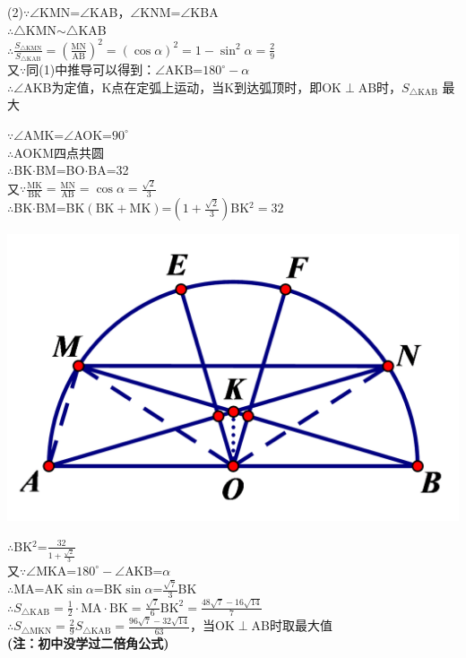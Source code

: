 \documentclass{article}
\begin{document}
    \newpage
    \noindent (2)\quad $\because $\quad $\angle $KMN=$\angle $KAB，$\angle $KNM=$\angle $KBA \\
    $\therefore $\quad $\bigtriangleup $KMN$\sim $$\bigtriangleup $KAB \\
    $\therefore $\quad $\frac{S_{\bigtriangleup\text{KMN}}}{S_{\bigtriangleup\text{KAB}}}=\left(\frac{\text{MN}}{\text{AB}}\right) ^{2}=\left(\cos\alpha\right) ^{2}=1-\sin ^{2} \alpha = \frac{2}{9}$ \\
    又$\because $\quad 同(1)中推导可以得到：$\angle $AKB=$180^{\circ }-\alpha $ \\
    $\therefore $\quad $\angle $AKB为定值，K点在定弧上运动，当K到达弧顶时，即OK$\perp $AB时，$S_{\bigtriangleup\text{KAB}}$
    \hspace*{0.5cm} 最大 \\
    \begin{minipage}[htbp]{0.65\linewidth}
    $\because $\quad $\angle $AMK=$\angle $AOK=$90^{\circ }$ \\
    $\therefore $\quad AOKM四点共圆 \\
    $\therefore $\quad BK$\cdot $BM=BO$\cdot $BA=32 \\
    又$\because $\quad $\frac{\text{MK}}{\text{BK}}=\frac{\text{MN}}{\text{AB}}=\cos\alpha =\frac{\sqrt{2}}{3}$ \\
    $\therefore $\quad BK$\cdot $BM=BK$\left(\text{BK}+\text{MK}\right)$=$\left(1+\frac{\sqrt{2}}{3}\right)$BK$^{2}=32$ \\
    \hfill
    \end{minipage}
    \begin{minipage}[htbp]{0.35\linewidth}
        \includegraphics[scale=0.2]{4jie.png}
    \end{minipage}
    $\therefore $\quad BK$^{2}$=$\frac{32}{1+\frac{\sqrt{2}}{3}}$ \\
    又$\because $\quad $\angle $MKA=$180^{\circ }-\angle $AKB=$\alpha $ \\
    $\therefore $\quad MA=AK$\sin\alpha $=BK$\sin\alpha $=$\frac{\sqrt{7}}{3}$BK \\
    $\therefore $\quad $S_{\bigtriangleup\text{KAB}}=\frac{1}{2}\cdot \text{MA}\cdot \text{BK}=\frac{\sqrt{7}}{6}\text{BK}^{2}=\frac{48\sqrt{7}-16\sqrt{14}}{7}$ \\
    $\therefore $\quad $S_{\bigtriangleup\text{MKN}}=\frac{2}{9}S_{\bigtriangleup\text{KAB}}=\frac{96\sqrt{7}-32\sqrt{14}}{63}$，当OK$\perp $AB时取最大值 \\
    \textbf{(注：初中没学过二倍角公式)}
\end{document}
